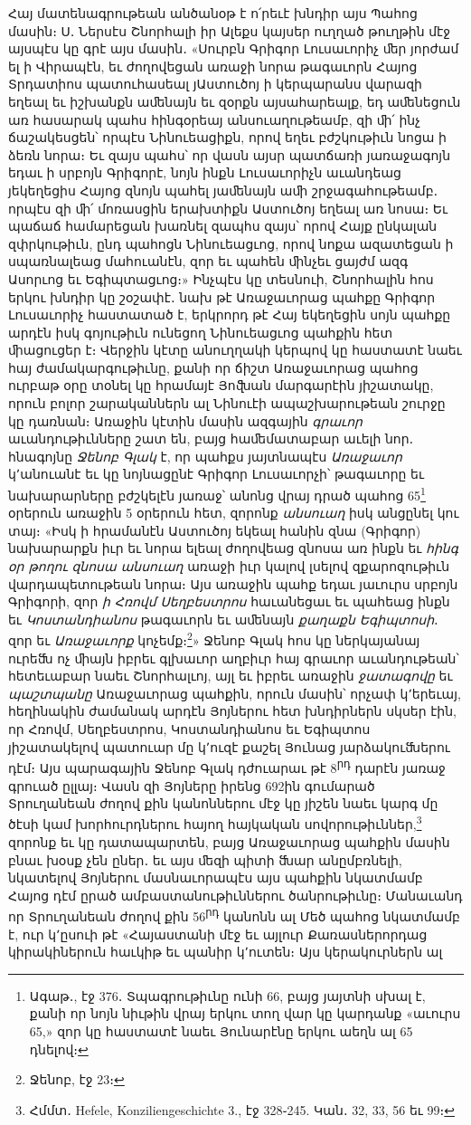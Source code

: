 \documentclass{article}
\begin{document}
{Հայ մատենագրութեան անծանօթ է ո՛րեւէ խնդիր այս Պահոց մասին։ Ս․ Ներսէս Շնորհալի իր Ալեքս կայսեր ուղղած թուղթին մէջ այսպէս կը գրէ այս մասին․ «Սուրբն Գրիգոր Լուսաւորիչ ﬔր յորժամ ել ի Վիրապէն, եւ ժողովեցան առաջի նորա թագաւորն Հայոց Տրդատիոս պատուհասեալ յԱստուծոյ ի կերպարանս վարազի եղեալ եւ իշխանքն աﬔնայն եւ զօրքն այսահարեալք, եդ աﬔնեցուն առ հասարակ պահս հինգօրեայ անսուաղութեամբ, զի ﬕ՛ ինչ ճաշակեսցեն՝ որպէս Նինուեացիքն, որով եղեւ բժշկութիւն նոցա ի ձեռն նորա։ Եւ զայս պահս՝ որ վասն այսր պատճառի յառաջագոյն եդաւ ի սրբոյն Գրիգորէ, նոյն ինքն Լուսաւորիչն աւանդեաց յեկեղեցիս Հայոց զնոյն պահել յաﬔնայն աﬕ շրջագահութեամբ․ որպէս զի ﬕ՛ մոռասցին երախտիքն Աստուծոյ եղեալ առ նոսա։ Եւ պաճաճ համարեցան խառնել զապհս զայս՝ որով Հայք ընկալան զփրկութիւն, ընդ պահոցն Նինուեացւոց, որով նոքա ազատեցան ի սպառնալեաց մահուանէն, զոր եւ պահեն ﬕնչեւ ցայժմ ազգ Ասորւոց եւ Եգիպտացւոց։» Ինչպէս կը տեսնուի, Շնորհալին հոս երկու խնդիր կը շօշափէ․ նախ թէ Առաջաւորաց պահքը Գրիգոր Լուսաւորիչ հաստատած է, երկրորդ թէ Հայ եկեղեցին սոյն պահքը արդէն իսկ գոյութիւն ունեցող Նինուեացւոց պահքին հետ ﬕացուցեր է։ Վերջին կէտը անուղղակի կերպով կը հաստատէ նաեւ հայ ժամակարգութիւնը, քանի որ ճիշտ Առաջաւորաց պահոց ուրբաթ օրը տօնել կը հրամայէ Յոﬖան մարգարէին յիշատակը, որուն բոլոր շարականներն ալ Նինուէի ապաշխարութեան շուրջը կը դառնան։ Առաջին կէտին մասին ազգային \emph{գրաւոր} աւանդութիւնները շատ են, բայց հաﬔմատաբար աւելի նոր․ հնագոյնը \emph{Ջենոբ Գլակ} է, որ պահքս յայտնապէս \emph{Առաջաւոր} կ՚անուանէ եւ կը նոյնացընէ Գրիգոր Լուսաւորչի՝ թագաւորը եւ նախարարները բժշկելէն յառաջ՝ անոնց վրայ դրած պահոց 65\footnote{Ագաթ․, էջ 376․ Տպագրութիւնը ունի 66, բայց յայտնի սխալ է, քանի որ նոյն նիւթին վրայ երկու տող վար կը կարդանք «աւուրս 65,» զոր կը հաստատէ նաեւ Յունարէնը երկու աեղն ալ 65 դնելով։} օրերուն առաջին 5 օրերուն հետ, զորոնք \emph{անսուաղ} իսկ անցընել կու տայ։ «Իսկ ի հրամանէն Աստուծոյ եկեալ հանին զնա (Գրիգոր) նախարարքն իւր եւ նորա ելեալ ժողովեաց զնոսա առ ինքն եւ \emph{հինգ օր թողու զնոսա անսուաղ} առաջի իւր կալով լսելով զքարոզութիւն վարդապետութեան նորա։ Այս առաջին պահք եդաւ յաւուրս սրբոյն Գրիգորի, զոր \emph{ի Հռովմ Սեղբեստրոս} հաւանեցաւ եւ պահեաց ինքն եւ \emph{Կոստանդիանոս} թագաւորն եւ աﬔնայն \emph{քաղաքն Եգիպտոսի}․ զոր եւ \emph{Առաջաւորք} կոչեմք։\footnote{Ջենոբ, էջ 23։}» Ջենոբ Գլակ հոս կը ներկայանայ ուրեﬓ ոչ ﬕայն իբրեւ գլխաւոր աղբիւր հայ գրաւոր աւանդութեան՝ հետեւաբար նաեւ Շնորհալւոյ, այլ եւ իբրեւ առաջին \emph{ջատագովը} եւ \emph{պաշտպանը} Առաջաւորաց պահքին, որուն մասին՝ որչափ կ՚երեւայ, հեղինակին ժամանակ արդէն Յոյներու հետ խնդիրներն սկսեր էին, որ Հռովմ, Սեղբեստրոս, Կոստանդիանոս եւ Եգիպտոս յիշատակելով պատուար մը կ՚ուզէ քաշել Յունաց յարձակուﬓերու դէմ։ Այս պարագային Ջենոբ Գլակ դժուարաւ թէ 8\textsuperscript{րդ} դարէն յառաջ գրուած ըլլայ։ Վասն զի Յոյները իրենց 692ին գումարած Տրուղանեան ժողով քին կանոններու մէջ կը յիշեն նաեւ կարգ մը ծէսի կամ խորհուրդներու հայող հայկական սովորութիւններ,\footnote{Հմմտ․ Hefele, Konziliengeschichte 3., էջ 328֊245. Կան․ 32, 33, 56 եւ 99։} զորոնք եւ կը դատապարտեն, բայց Առաջաւորաց պահքին մասին բնաւ խօսք չեն ըներ․ եւ այս ﬔզի պիտի ﬓար անըմբռնելի, նկատելով Յոյներու մասնաւորապէս այս պահքին նկատմամբ Հայոց դէմ ըրած ամբաստանութիւններու ծանրութիւնը։ Մանաւանդ որ Տրուղանեան ժողով քին 56\textsuperscript{րդ} կանոնն ալ Մեծ պահոց նկատմամբ է, ուր կ՚ըսուի թէ «Հայաստանի մէջ եւ այլուր Քառասներորդաց կիրակիներուն հաւկիթ եւ պանիր կ՚ուտեն։ Այս կերակուրներն ալ }
\end{document}
